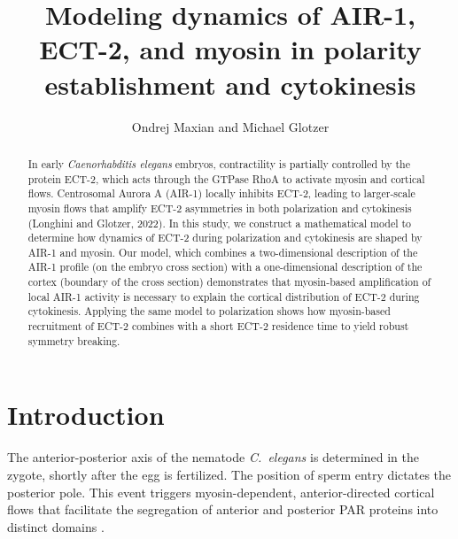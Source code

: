 \documentclass[11pt]{article}
\title{Modeling dynamics of AIR-1, ECT-2, and myosin in polarity establishment and cytokinesis \vspace{-0.5 cm}}
\author{Ondrej Maxian and Michael Glotzer \vspace{-0.75 cm}}
\begin{document}
\maketitle

\begin{abstract}
In early \emph{Caenorhabditis elegans} embryos, contractility is partially controlled by the protein ECT-2, which acts through the GTPase RhoA to activate myosin and cortical flows. Centrosomal Aurora A (AIR-1) locally inhibits ECT-2, leading to larger-scale myosin flows that amplify ECT-2 asymmetries in both polarization and cytokinesis (Longhini and Glotzer, 2022). In this study, we construct a mathematical model to determine how dynamics of ECT-2 during polarization and cytokinesis are shaped by AIR-1 and myosin. Our model, which combines a two-dimensional description of the AIR-1 profile (on the embryo cross section) with a one-dimensional description of the cortex (boundary of the cross section) demonstrates that myosin-based amplification of local AIR-1 activity is necessary to explain the cortical distribution of ECT-2 during cytokinesis. Applying the same model to polarization shows how myosin-based recruitment of ECT-2 combines with a short ECT-2 residence time to yield robust symmetry breaking.
\end{abstract}

\section{Introduction}
The anterior-posterior axis of the nematode \emph{C.\ elegans} is determined in the zygote, shortly after the egg is fertilized.  The position of sperm entry dictates the posterior pole. This event triggers myosin-dependent, anterior-directed cortical flows that facilitate the segregation of anterior and posterior PAR proteins into distinct domains \cite{munro2004cortical, lang2017proteins, gross2019guiding}.
\end{document}
